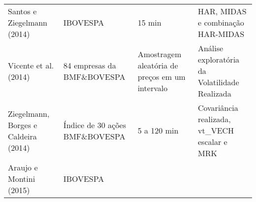 \documentclass[]{article}
\begin{document}
\begin{longtable}[]{@{}llll@{}}
\begin{minipage}[t]{0.17\columnwidth}\raggedright\strut
Santos e Ziegelmann (2014)\strut
\end{minipage} & \begin{minipage}[t]{0.17\columnwidth}\raggedright\strut
IBOVESPA\strut
\end{minipage} & \begin{minipage}[t]{0.15\columnwidth}\raggedright\strut
15 min\strut
\end{minipage} & \begin{minipage}[t]{0.23\columnwidth}\raggedright\strut
HAR, MIDAS e combinação HAR-MIDAS\strut
\end{minipage}\tabularnewline
\begin{minipage}[t]{0.17\columnwidth}\raggedright\strut
Vicente et al. (2014)\strut
\end{minipage} & \begin{minipage}[t]{0.17\columnwidth}\raggedright\strut
84 empresas da BMF\&BOVESPA\strut
\end{minipage} & \begin{minipage}[t]{0.15\columnwidth}\raggedright\strut
Amostragem aleatória de preços em um intervalo\strut
\end{minipage} & \begin{minipage}[t]{0.23\columnwidth}\raggedright\strut
Análise exploratória da Volatilidade Realizada\strut
\end{minipage}\tabularnewline
\begin{minipage}[t]{0.17\columnwidth}\raggedright\strut
Ziegelmann, Borges e Caldeira (2014)\strut
\end{minipage} & \begin{minipage}[t]{0.17\columnwidth}\raggedright\strut
Índice de 30 ações BMF\&BOVESPA\strut
\end{minipage} & \begin{minipage}[t]{0.15\columnwidth}\raggedright\strut
5 a 120 min\strut
\end{minipage} & \begin{minipage}[t]{0.23\columnwidth}\raggedright\strut
Covariância realizada, vt\_VECH escalar e MRK\strut
\end{minipage}\tabularnewline
\begin{minipage}[t]{0.17\columnwidth}\raggedright\strut
Araujo e Montini (2015)\strut
\end{minipage} & \begin{minipage}[t]{0.17\columnwidth}\raggedright\strut
IBOVESPA\strut
\end{minipage} & \begin{minipage}[t]{0.15\columnwidth}\raggedright\strut

\end{minipage}
\end{longtable}
\end{document}
